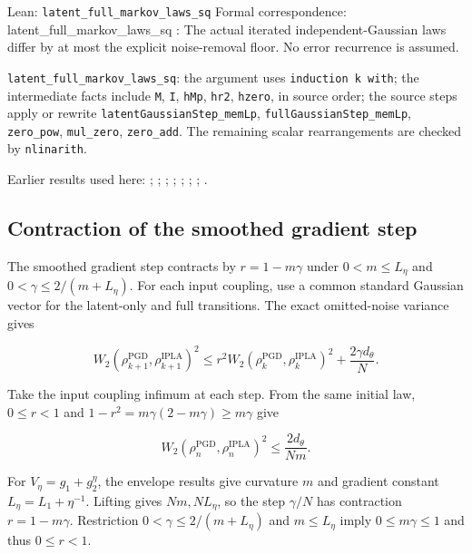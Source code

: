 \documentclass[11pt,a4paper]{report}
\begin{document}
\begin{leanbox}{Lean: \texttt{latent\_\allowbreak{}full\_\allowbreak{}markov\_\allowbreak{}laws\_\allowbreak{}sq}}
Formal correspondence: latent\_full\_markov\_laws\_sq : The actual iterated independent-Gaussian laws differ by at most the explicit noise-removal floor. No error recurrence is assumed.



\texttt{latent\_\allowbreak{}full\_\allowbreak{}markov\_\allowbreak{}laws\_\allowbreak{}sq}: the argument uses \texttt{induction k with}; the intermediate facts include \texttt{M}, \texttt{I}, \texttt{h\allowbreak{}Mp}, \texttt{hr2}, \texttt{hzero}, in source order; the source steps apply or rewrite \texttt{latent\allowbreak{}Gaussian\allowbreak{}Step\_\allowbreak{}mem\allowbreak{}Lp}, \texttt{full\allowbreak{}Gaussian\allowbreak{}Step\_\allowbreak{}mem\allowbreak{}Lp}, \texttt{zero\_\allowbreak{}pow}, \texttt{mul\_\allowbreak{}zero}, \texttt{zero\_\allowbreak{}add}. The remaining scalar rearrangements are checked by \texttt{nlinarith}.
\end{leanbox}


Earlier results used here: \cite[Section~3.15.3]{LangevinLean2026ULASC}; \cite[Section~3.17.3]{LangevinLean2026ULASC}; \cite[Section~3.17.4]{LangevinLean2026ULASC}; \cite[Section~3.17.9]{LangevinLean2026ULASC}; \cite[Section~3.21.2]{LangevinLean2026ULASC}; \cite[Section~3.33.11]{LangevinLean2026ULASC}; \cite[Section~3.33.6]{LangevinLean2026ULASC}; \cite[Section~3.1.1]{LangevinLean2026IPLA}.
\subsection{\texorpdfstring{Contraction of the smoothed gradient step}{Contraction of the smoothed gradient step}}
\label{report-step-ProximalLangevin-MYPGD-lean-3}


The smoothed gradient step contracts by \(r=1-m\gamma\) under \(0<m\le L_\eta\) and \(0<\gamma\le2/(m+L_\eta)\). For each input coupling, use a common standard Gaussian vector for the latent-only and full transitions. The exact omitted-noise variance gives

\[
W_2(\rho^{\mathrm{PGD}}_{k+1},\rho^{\mathrm{IPLA}}_{k+1})^2
 \le r^2 W_2(\rho^{\mathrm{PGD}}_k,\rho^{\mathrm{IPLA}}_k)^2
       +\frac{2\gamma d_\theta}{N}.
\]

Take the input coupling infimum at each step. From the same initial law, \(0\le r<1\) and \(1-r^2=m\gamma(2-m\gamma)\ge m\gamma\) give

\[
W_2(\rho^{\mathrm{PGD}}_n,\rho^{\mathrm{IPLA}}_n)^2
 \le\frac{2d_\theta}{Nm}.
\]

For \(V_\eta=g_1+g_2^\eta\), the envelope results give curvature \(m\) and gradient constant \(L_\eta=L_1+\eta^{-1}\). Lifting gives \(Nm,NL_\eta\), so the step \(\gamma/N\) has contraction \(r=1-m\gamma\). Restriction \(0<\gamma\le2/(m+L_\eta)\) and \(m\le L_\eta\) imply \(0\le m\gamma\le1\) and thus \(0\le r<1\).
\end{document}
